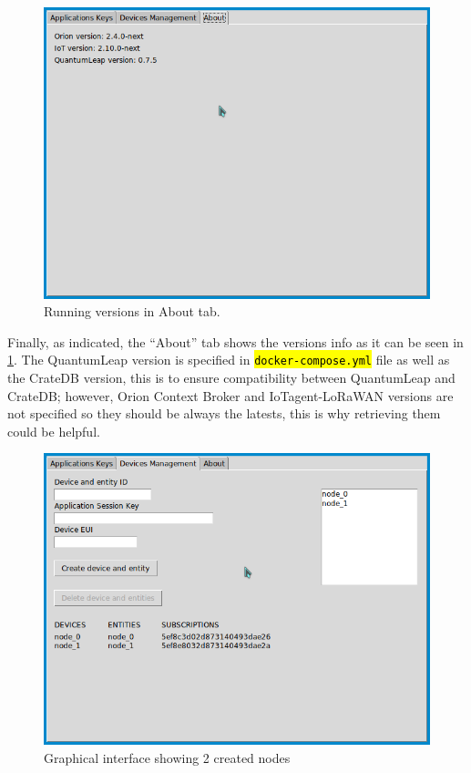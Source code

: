 \documentclass[11pt,a4paper,dvipsnames,twoside]{article}
\newcommand{\cmd}[1] {\hl{\texttt{#1}}}
\begin{document}
\begin{figure}[htp]
  \centering
  \includegraphics[width=.9\textwidth]{../pictures/GUI_about_tab.png}
  \caption{Running versions in About tab.}
  \label{fig:about_tab}
\end{figure}

Finally, as indicated, the \enquote{About} tab shows the versions info as it can be seen in \ref{fig:about_tab}. The QuantumLeap version is specified in \cmd{docker-compose.yml} file as well as the CrateDB version, this is to ensure compatibility between QuantumLeap and CrateDB; however, Orion Context Broker and IoTagent-LoRaWAN versions are not specified so they should be always the latests, this is why retrieving them could be helpful. 

\begin{figure}[ht]
  \centering
  \includegraphics[width=.9\textwidth]{../pictures/GUI_device_management_2nodes.png}
  \caption{Graphical interface showing 2 created nodes}
  \label{fig:GUI_2nodes}
\end{figure}
\end{document}
